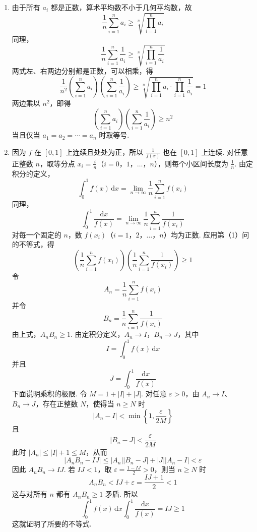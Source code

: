 \begin{solution}
\begin{enumerate}
\item 由于所有 \(a_i\) 都是正数，算术平均数不小于几何平均数，故
\[
\frac{1}{n}\sum_{i=1}^{n}a_i\geqslant\sqrt[n]{\prod_{i=1}^{n}a_i}
\]
同理，
\[
\frac{1}{n}\sum_{i=1}^{n}\frac{1}{a_i}\geqslant\sqrt[n]{\prod_{i=1}^{n}\frac{1}{a_i}}
\]
两式左、右两边分别都是正数，可以相乘，得
\[
\frac{1}{n^{2}}\left(\sum_{i=1}^{n}a_i\right)\left(\sum_{i=1}^{n}\frac{1}{a_i}\right)
\geqslant
\sqrt[n]{\prod_{i=1}^{n}a_i\cdot\prod_{i=1}^{n}\frac{1}{a_i}}=1
\]
两边乘以 \(n^{2}\)，即得
\[
\left(\sum_{i=1}^{n}a_i\right)\left(\sum_{i=1}^{n}\frac{1}{a_i}\right)\geqslant n^{2}
\]
当且仅当 \(a_1=a_2=\cdots=a_n\) 时取等号.

\item 因为 \(f\) 在 \([0,1]\) 上连续且处处为正，所以 \(\frac{1}{f(x)}\) 也在 \([0,1]\) 上连续. 对任意正整数 \(n\)，取等分点 \(x_i=\frac{i}{n}\)（\(i=0\)，\(1\)，\(\dots\)，\(n\)），则每个小区间长度为 \(\frac{1}{n}\). 由定积分的定义，
\[
\int_{0}^{1}f(x)\,\mathrm{d}x=\displaystyle\lim_{n\to\infty}\frac{1}{n}\sum_{i=1}^{n}f(x_i)
\]
同理，
\[
\int_{0}^{1}\frac{\mathrm{d}x}{f(x)}=\displaystyle\lim_{n\to\infty}\frac{1}{n}\sum_{i=1}^{n}\frac{1}{f(x_i)}
\]
对每一个固定的 \(n\)，数 \(f(x_i)\)（\(i=1\)，\(2\)，\(\dots\)，\(n\)）均为正数. 应用第（1）问的不等式，得
\[
\left(\frac{1}{n}\sum_{i=1}^{n}f(x_i)\right)\left(\frac{1}{n}\sum_{i=1}^{n}\frac{1}{f(x_i)}\right)\geqslant1
\]
令
\[
A_n=\frac{1}{n}\sum_{i=1}^{n}f(x_i)
\]
并令
\[
B_n=\frac{1}{n}\sum_{i=1}^{n}\frac{1}{f(x_i)}
\]
由上式，\(A_nB_n\geqslant1\). 由定积分定义，\(A_n\to I\)，\(B_n\to J\)，其中
\[
I=\int_{0}^{1}f(x)\,\mathrm{d}x
\]
并且
\[
J=\int_{0}^{1}\frac{\mathrm{d}x}{f(x)}
\]
下面说明乘积的极限. 令 \(M=1+\lvert I\rvert+\lvert J\rvert\). 对任意 \(\varepsilon>0\)，由 \(A_n\to I\)、\(B_n\to J\)，存在正整数 \(N\)，使得当 \(n\geqslant N\) 时
\[
\lvert A_n-I\rvert<\min\left\{1,\frac{\varepsilon}{2M}\right\}
\]
且
\[
\lvert B_n-J\rvert<\frac{\varepsilon}{2M}
\]
此时 \(\lvert A_n\rvert\leqslant\lvert I\rvert+1\leqslant M\)，从而
\[
\lvert A_nB_n-IJ\rvert
\leqslant\lvert A_n\rvert\lvert B_n-J\rvert+\lvert J\rvert\lvert A_n-I\rvert
<\varepsilon
\]
因此 \(A_nB_n\to IJ\). 若 \(IJ<1\)，取 \(\varepsilon=\frac{1-IJ}{2}>0\)，则当 \(n\geqslant N\) 时
\[
A_nB_n<IJ+\varepsilon=\frac{IJ+1}{2}<1
\]
这与对所有 \(n\) 都有 \(A_nB_n\geqslant1\) 矛盾. 所以
\[
\int_{0}^{1}f(x)\,\mathrm{d}x\int_{0}^{1}\frac{\mathrm{d}x}{f(x)}=IJ\geqslant1
\]
这就证明了所要的不等式.
\end{enumerate}
\end{solution}
